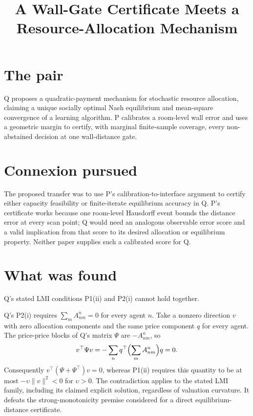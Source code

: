 \documentclass{article}
\title{A Wall-Gate Certificate Meets a Resource-Allocation Mechanism}
\begin{document}
\maketitle

\section*{The pair}

Q proposes a quadratic-payment mechanism for stochastic resource allocation, claiming a unique socially optimal Nash equilibrium and mean-square convergence of a learning algorithm. P calibrates a room-level wall error and uses a geometric margin to certify, with marginal finite-sample coverage, every non-abstained decision at one wall-distance gate. 

\section*{Connexion pursued}

The proposed transfer was to use P's calibration-to-interface argument to certify either capacity feasibility or finite-iterate equilibrium accuracy in Q. P's certificate works because one room-level Hausdorff event bounds the distance error at every scan point; Q would need an analogous observable error score and a valid implication from that score to its desired allocation or equilibrium property. Neither paper supplies such a calibrated score for Q. 

\section*{What was found}

\begin{claim}
Q's stated LMI conditions P1(ii) and P2(i) cannot hold together.
\end{claim}
Q's P2(i) requires \(\sum_m A_{nm}^{n}=0\) for every agent \(n\). Take a nonzero direction \(v\) with zero allocation components and the same price component \(q\) for every agent. The price-price blocks of Q's matrix \(\Psi\) are \(-A_{nm}^{n}\), so
\[
v^{\top}\Psi v
=
-\sum_n q^{\top}\Bigl(\sum_m A_{nm}^{n}\Bigr)q
=0.
\]
Consequently \(v^{\top}(\Psi+\Psi^{\top})v=0\), whereas P1(ii) requires this quantity to be at most \(-\upsilon\lVert v\rVert^2<0\) for \(\upsilon>0\). The contradiction applies to the stated LMI family, including its claimed explicit solution, regardless of valuation curvature. It defeats the strong-monotonicity premise considered for a direct equilibrium-distance certificate. 
\end{document}
